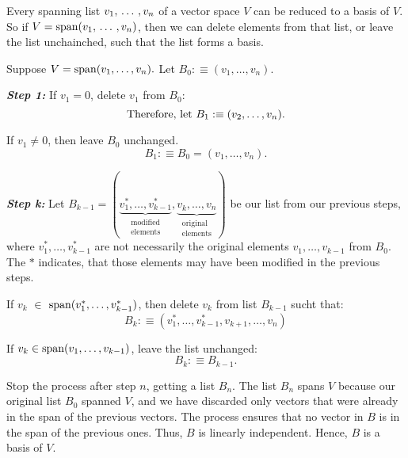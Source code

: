 \setcounter{thm}{29}
\begin{thm} 
  \label{thm: every spanning list contains a basis}
  Every spanning list $v_1, {\, \ldots \,\,}, v_n$ of a vector space $V$ can be reduced to a basis of $V$. So if $V= \operatorname{span} (v_1, {\, \ldots \,\,}, v_n)$, then we can delete elements from that list, or leave the list unchainched, such that the list forms a basis.
\end{thm}
\begin{prf}
  Suppose $V=\operatorname{span} (v_1, \ldots, v_n).$ Let $B_0 :\equiv (v_1, \ldots, v_n)$.

  \emph{\bfseries Step 1: }
  If $v_1 = 0$, delete $v_1$ from $B_0$:
  \begin{equation}
    $Therefore, let $B_1 :\equiv (v_2, \ldots, v_n).
  \end{equation}

  If $v_1 \neq 0$, then leave $B_0$ unchanged.
  \begin{equation}
    B_1 :\equiv B_0=(v_1, \ldots, v_n).
  \end{equation}

  \emph{\bfseries Step k: }
  Let $B_{k-1} = (\underbrace{v_{1}^*, \ldots, v_{k-1}^*}_{\substack{\text{modified} \\ \text{elements}}}, \underbrace{v^{\phantom{*}}_{k}, \ldots, v^{\phantom{*}}_n}_{\substack{\text{original} \\ \text{elements}}})$ be our list from our previous steps, where $v_1^*, \ldots, v_{k-1}^*$ are not necessarily the original elements $v_1, \ldots, v_{k-1}$ from $B_0$. The $*$ indicates, that those elements may have been modified in the previous steps.

  If $v_k$ $\in$ $\operatorname{span} (v_1^*, \ldots, v_{k-1}^*)$, then delete $v_k$ from list $B_{k-1}$ sucht that:
  \begin{equation}
    B_k :\equiv  (v_{1}^*, \ldots, v_{k-1}^*, v_{k+1}, \ldots, v_n)
  \end{equation}



  If $v_k \in \operatorname{span} (v_1, \ldots, v_{k-1})$, leave the list unchanged:
  \begin{equation}
    B_k :\equiv B_{k-1}.
  \end{equation}

  Stop the process after step $n$, getting a list $B_n$. The list $B_n$ spans $V$ because our original list $B_0$ spanned $V$, and we have discarded only vectors that were already in the span of the previous vectors. The process ensures that no vector in $B$ is in the span of the previous ones. Thus, $B$ is linearly independent. Hence, $B$ is a basis of $V$.
\end{prf}

